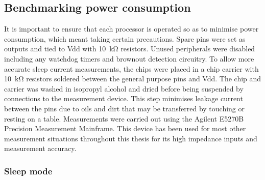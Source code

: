 


  \subsection{Benchmarking power consumption}

    It is important to ensure that each processor is operated so as to minimise power consumption, which meant taking certain precautions.
    Spare pins were set as outputs and tied to Vdd with \SI{10}{\kilo\ohm} resistors.
    Unused peripherals were disabled including any watchdog timers and brownout detection circuitry.
    To allow more accurate sleep current measurements, the chips were placed in a chip carrier with \SI{10}{\kilo\ohm} resistors soldered between the general purpose pins and Vdd.
    The chip and carrier was washed in isopropyl alcohol and dried before being suspended by connections to the measurement device.
    This step minimises leakage current between the pins due to oils and dirt that may be transferred by touching or resting on a table.
    Measurements were carried out using the Agilent E5270B Precision Measurement Mainframe.
    This device has been used for most other measurement situations throughout this thesis for its high impedance inputs and measurement accuracy.


    \subsubsection{Sleep mode}


